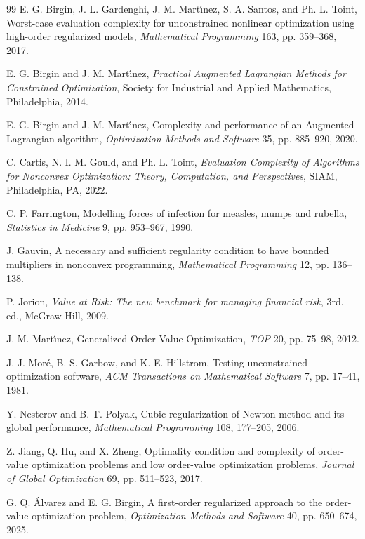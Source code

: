 \documentclass[11pt]{article}
\begin{document}
\begin{thebibliography}{99}
 E. G. Birgin, J. L. Gardenghi, J. M. Mart\'{\i}nez, S. A. Santos, and Ph. L. Toint, Worst-case evaluation complexity for unconstrained nonlinear optimization using high-order regularized models, \textit{Mathematical Programming} 163, pp. 359--368, 2017.

 E. G. Birgin and J. M. Mart\'{\i}nez, \textit{Practical Augmented Lagrangian Methods for Constrained Optimization}, Society for Industrial and Applied Mathematics, Philadelphia, 2014.

 E. G. Birgin and J. M. Mart\'{\i}nez, Complexity and performance of an Augmented Lagrangian algorithm, \textit{Optimization Methods and Software} 35, pp. 885--920, 2020.

 C. Cartis, N. I. M. Gould, and Ph. L. Toint, \textit{Evaluation Complexity of Algorithms for Nonconvex Optimization: Theory, Computation, and Perspectives}, SIAM, Philadelphia, PA, 2022.

 C. P. Farrington, Modelling forces of infection for measles, mumps and rubella, \textit{Statistics in Medicine} 9, pp. 953--967, 1990.

 J. Gauvin, A necessary and sufficient regularity condition to have bounded multipliers in nonconvex programming, \textit{Mathematical Programming} 12, pp. 136--138.
  
 P. Jorion, \textit{Value at {R}isk: {T}he new benchmark for managing financial risk}, 3rd. ed., McGraw-Hill, 2009.

 J. M. Mart\'{\i}nez, Generalized Order-Value Optimization, \textit{TOP} 20, pp. 75--98, 2012.

 J. J. Mor\'e, B. S. Garbow, and K. E. Hillstrom, Testing unconstrained optimization software, \textit{ACM Transactions on Mathematical Software} 7, pp. 17--41, 1981.
  
 Y. Nesterov and B. T. Polyak, Cubic regularization of Newton method and its global performance, \textit{Mathematical Programming} 108, 177--205, 2006.

 Z. Jiang, Q. Hu, and X. Zheng, Optimality condition and complexity of order-value optimization problems and low order-value optimization problems, \textit{Journal of Global Optimization} 69, pp. 511--523, 2017.

 G. Q. Álvarez and E. G. Birgin, A first-order regularized approach to the order-value optimization problem, \textit{Optimization Methods and Software} 40, pp. 650--674, 2025.
    
\end{thebibliography}
\end{document}
